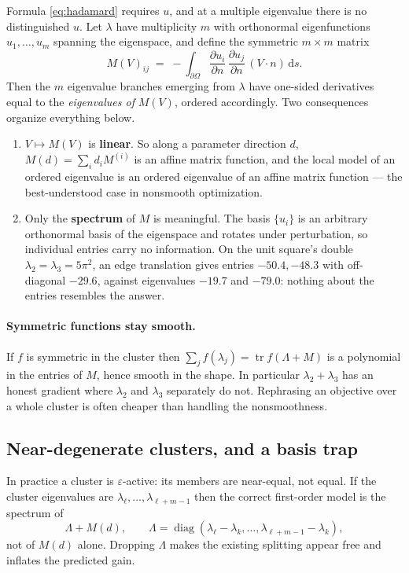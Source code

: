 \documentclass[11pt]{article}
\newcommand{\dd}{\,\mathrm{d}}
\newcommand{\bd}{\partial\Omega}
\newcommand{\pdn}[1]{\frac{\partial #1}{\partial n}}
\theoremstyle{definition}
\begin{document}
Formula \eqref{eq:hadamard} requires $u$, and at a multiple eigenvalue there is no distinguished
$u$. Let $\lambda$ have multiplicity $m$ with orthonormal eigenfunctions $u_1,\dots,u_m$ spanning
the eigenspace, and define the symmetric $m\times m$ matrix
\begin{equation}\label{eq:M}
  M(V)_{ij}\;=\;-\int_{\bd}\pdn{u_i}\,\pdn{u_j}\,(V\!\cdot\!n)\dd s .
\end{equation}
Then the $m$ eigenvalue branches emerging from $\lambda$ have one-sided derivatives equal to the
\emph{eigenvalues of} $M(V)$, ordered accordingly. Two consequences organize everything below.

\begin{enumerate}
\item $V\mapsto M(V)$ is \textbf{linear}. So along a parameter direction $d$,
  $M(d)=\sum_i d_i M^{(i)}$ is an affine matrix function, and the local model of an ordered
  eigenvalue is an ordered eigenvalue of an affine matrix function --- the best-understood case
  in nonsmooth optimization.
\item Only the \textbf{spectrum} of $M$ is meaningful. The basis $\{u_i\}$ is an arbitrary
  orthonormal basis of the eigenspace and rotates under perturbation, so individual entries carry
  no information. On the unit square's double $\lambda_2=\lambda_3=5\pi^2$, an edge translation
  gives entries $-50.4,-48.3$ with off-diagonal $-29.6$, against eigenvalues $-19.7$ and $-79.0$:
  nothing about the entries resembles the answer.
\end{enumerate}

\paragraph{Symmetric functions stay smooth.} If $f$ is symmetric in the cluster then
$\sum_j f(\lambda_j)=\operatorname{tr}f(\Lambda+M)$ is a polynomial in the entries of $M$, hence
smooth in the shape. In particular $\lambda_2+\lambda_3$ has an honest gradient where
$\lambda_2$ and $\lambda_3$ separately do not. Rephrasing an objective over a whole cluster is
often cheaper than handling the nonsmoothness.

\subsection{Near-degenerate clusters, and a basis trap}\label{sec:nearly}

In practice a cluster is $\varepsilon$-active: its members are near-equal, not equal. If the
cluster eigenvalues are $\lambda_{\ell},\dots,\lambda_{\ell+m-1}$ then the correct first-order
model is the spectrum of
\begin{equation}\label{eq:LambdaM}
  \Lambda+M(d),\qquad \Lambda=\operatorname{diag}(\lambda_{\ell}-\lambda_k,\dots,
  \lambda_{\ell+m-1}-\lambda_k),
\end{equation}
not of $M(d)$ alone. Dropping $\Lambda$ makes the existing splitting appear free and inflates the
predicted gain.
\end{document}
